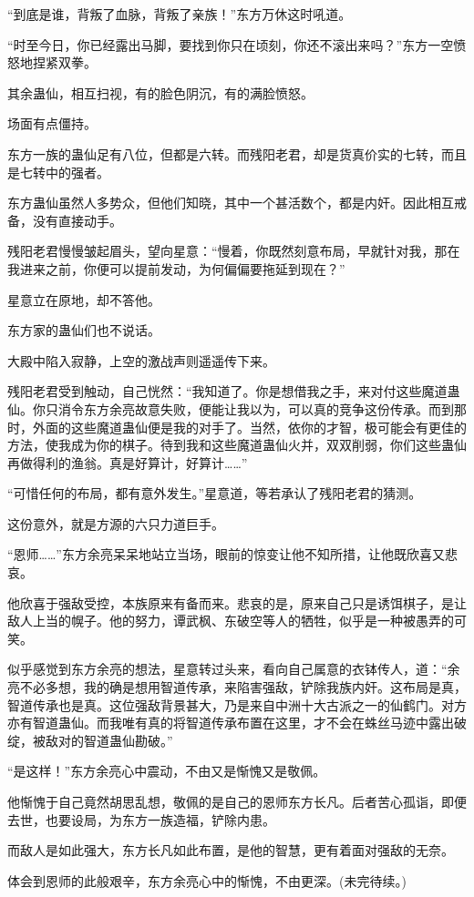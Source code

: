 \begin{this_body}
“到底是谁，背叛了血脉，背叛了亲族！”东方万休这时吼道。

“时至今日，你已经露出马脚，要找到你只在顷刻，你还不滚出来吗？”东方一空愤怒地捏紧双拳。

其余蛊仙，相互扫视，有的脸色阴沉，有的满脸愤怒。

场面有点僵持。

东方一族的蛊仙足有八位，但都是六转。而残阳老君，却是货真价实的七转，而且是七转中的强者。

东方蛊仙虽然人多势众，但他们知晓，其中一个甚活数个，都是内奸。因此相互戒备，没有直接动手。

残阳老君慢慢皱起眉头，望向星意：“慢着，你既然刻意布局，早就针对我，那在我进来之前，你便可以提前发动，为何偏偏要拖延到现在？”

星意立在原地，却不答他。

东方家的蛊仙们也不说话。

大殿中陷入寂静，上空的激战声则遥遥传下来。

残阳老君受到触动，自己恍然：“我知道了。你是想借我之手，来对付这些魔道蛊仙。你只消令东方余亮故意失败，便能让我以为，可以真的竞争这份传承。而到那时，外面的这些魔道蛊仙便是我的对手了。当然，依你的才智，极可能会有更佳的方法，使我成为你的棋子。待到我和这些魔道蛊仙火并，双双削弱，你们这些蛊仙再做得利的渔翁。真是好算计，好算计……”

“可惜任何的布局，都有意外发生。”星意道，等若承认了残阳老君的猜测。

这份意外，就是方源的六只力道巨手。

“恩师……”东方余亮呆呆地站立当场，眼前的惊变让他不知所措，让他既欣喜又悲哀。

他欣喜于强敌受控，本族原来有备而来。悲哀的是，原来自己只是诱饵棋子，是让敌人上当的幌子。他的努力，谭武枫、东破空等人的牺牲，似乎是一种被愚弄的可笑。

似乎感觉到东方余亮的想法，星意转过头来，看向自己属意的衣钵传人，道：“余亮不必多想，我的确是想用智道传承，来陷害强敌，铲除我族内奸。这布局是真，智道传承也是真。这位强敌背景甚大，乃是来自中洲十大古派之一的仙鹤门。对方亦有智道蛊仙。而我唯有真的将智道传承布置在这里，才不会在蛛丝马迹中露出破绽，被敌对的智道蛊仙勘破。”

“是这样！”东方余亮心中震动，不由又是惭愧又是敬佩。

他惭愧于自己竟然胡思乱想，敬佩的是自己的恩师东方长凡。后者苦心孤诣，即便去世，也要设局，为东方一族造福，铲除内患。

而敌人是如此强大，东方长凡如此布置，是他的智慧，更有着面对强敌的无奈。

体会到恩师的此般艰辛，东方余亮心中的惭愧，不由更深。(未完待续。)

\end{this_body}


